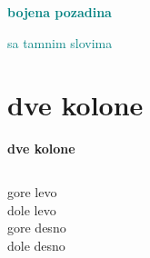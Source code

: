 \documentclass{beamer}
\begin{document}
\begin{frame}{\textcolor{teal}{\textbf{bojena pozadina}}}
	\begin{Huge}
		\textcolor{teal}{sa tamnim slovima}
	\end{Huge}
\end{frame}


\section{dve kolone}

\begin{frame}{\textbf{dve kolone}}
	\begin{columns}
		\column{5cm}
			gore levo \\
			dole levo \\
		\column{5cm}
			gore desno \\
			dole desno \\
	\end{columns}

\end{frame}
\end{document}
